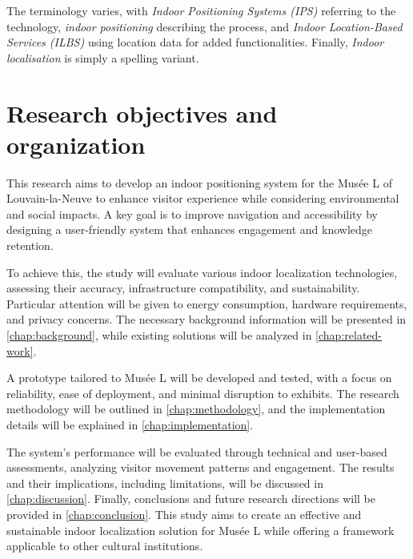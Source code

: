 The terminology varies, with \textit{Indoor Positioning Systems (IPS)}  referring to the technology, \textit{indoor positioning} describing the process, and \textit{Indoor Location-Based Services (ILBS)}  using location data for added functionalities. Finally, \textit{Indoor localisation} is simply a spelling variant. 

\section{Research objectives and organization}



This research aims to develop an indoor positioning system for the Musée L of Louvain-la-Neuve to enhance visitor experience while considering environmental and social impacts. A key goal is to improve navigation and accessibility by designing a user-friendly system that enhances engagement and knowledge retention.  

To achieve this, the study will evaluate various indoor localization technologies, assessing their accuracy, infrastructure compatibility, and sustainability. Particular attention will be given to energy consumption, hardware requirements, and privacy concerns. The necessary background information will be presented in \autoref{chap:background}, while existing solutions will be analyzed in \autoref{chap:related-work}.   

A prototype tailored to Musée L will be developed and tested, with a focus on reliability, ease of deployment, and minimal disruption to exhibits. The research methodology will be outlined in \autoref{chap:methodology}, and the implementation details will be explained in \autoref{chap:implementation}.   

The system’s performance will be evaluated through technical and user-based assessments, analyzing visitor movement patterns and engagement. The results and their implications, including limitations, will be discussed in \autoref{chap:discussion}. Finally, conclusions and future research directions will be provided in \autoref{chap:conclusion}. This study aims to create an effective and sustainable indoor localization solution for Musée L while offering a framework applicable to other cultural institutions. 
